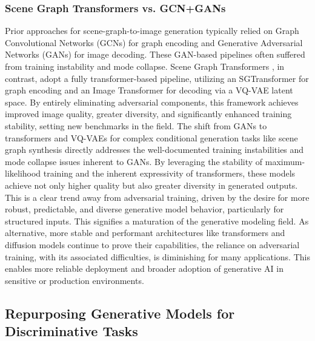 \documentclass[a4paper]{article}
\begin{document}
\subsubsection*{Scene Graph Transformers vs. GCN+GANs}
Prior approaches for scene-graph-to-image generation typically relied on Graph Convolutional Networks (GCNs) for graph encoding and Generative Adversarial Networks (GANs) for image decoding. These GAN-based pipelines often suffered from training instability and mode collapse. Scene Graph Transformers \cite{Sortino2023TransformerSceneGraphs}, in contrast, adopt a fully transformer-based pipeline, utilizing an SGTransformer for graph encoding and an Image Transformer for decoding via a VQ-VAE latent space. By entirely eliminating adversarial components, this framework achieves improved image quality, greater diversity, and significantly enhanced training stability, setting new benchmarks in the field. The shift from GANs to transformers and VQ-VAEs for complex conditional generation tasks like scene graph synthesis directly addresses the well-documented training instabilities and mode collapse issues inherent to GANs. By leveraging the stability of maximum-likelihood training and the inherent expressivity of transformers, these models achieve not only higher quality but also greater diversity in generated outputs. This is a clear trend away from adversarial training, driven by the desire for more robust, predictable, and diverse generative model behavior, particularly for structured inputs. This signifies a maturation of the generative modeling field. As alternative, more stable and performant architectures like transformers and diffusion models continue to prove their capabilities, the reliance on adversarial training, with its associated difficulties, is diminishing for many applications. This enables more reliable deployment and broader adoption of generative AI in sensitive or production environments.

\subsection{Repurposing Generative Models for Discriminative Tasks}
\end{document}
